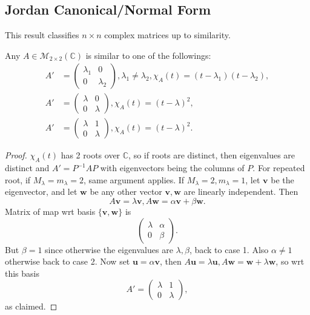 \documentclass[a4paper]{article}
\begin{document}
    \subsection{Jordan Canonical/Normal Form}
    This result classifies $n\times n$ complex matrices up to similarity.
    \begin{proposition}
      Any $ A\in \mathcal{M}_{2\times 2}(\mathbb{C}) $ is similar to
      one of the followings:
      \begin{align*}
        A' &=
        \begin{pmatrix}
          \lambda_1&0\\
          0&\lambda_2
        \end{pmatrix},\lambda_1\neq \lambda_2,
        \chi_A(t)=(t-\lambda_1)(t-\lambda_2),\\
        A'&=
        \begin{pmatrix}
          \lambda&0\\
          0&\lambda
        \end{pmatrix},\chi_A(t)=(t-\lambda)^2, \\
        A'&=
        \begin{pmatrix}
          \lambda&1\\
          0&\lambda
        \end{pmatrix},\chi_A(t)=(t-\lambda)^2.
      \end{align*}
    \end{proposition}
    \begin{proof}
      $ \chi_A(t) $ has 2 roots over $ \mathbb{C} $, so if roots are
      distinct, then eigenvalues are distinct and $A'=P^{-1}AP$ with
      eigenvectors being the columns of $P$. For repeated root, if $
      M_\lambda=m_\lambda=2 $, same argument applies. If $
      M_\lambda=2, m_\lambda=1 $, let $\mathbf{v}$ be the
      eigenvector, and let $\mathbf{w}$ be any other vector $
      \mathbf{v},\mathbf{w} $ are linearly independent. Then
      \[
        A\mathbf{v}=\lambda\mathbf{v}, A\mathbf{w} =
        \alpha\mathbf{v}+\beta\mathbf{w}.
      \]
      Matrix of map wrt basis $ \{\mathbf{v},\mathbf{w}\} $ is
      \[
        \begin{pmatrix}
          \lambda&\alpha\\
          0&\beta
        \end{pmatrix}.
      \]
      But $ \beta=1 $ since otherwise the eigenvalues are $
      \lambda,\beta $, back to case 1. Also $ \alpha\neq 1 $
      otherwise back to case 2. Now set $ \mathbf{u}=\alpha\mathbf{v}
      $, then $ A\mathbf{u}=\lambda \mathbf{u}, A\mathbf{w} =
      \mathbf{w}+\lambda\mathbf{w} $, so wrt this basis
      \[
        A'=
        \begin{pmatrix}
          \lambda&1\\
          0&\lambda
        \end{pmatrix},
      \]
      as claimed.
    \end{proof}
\end{document}

